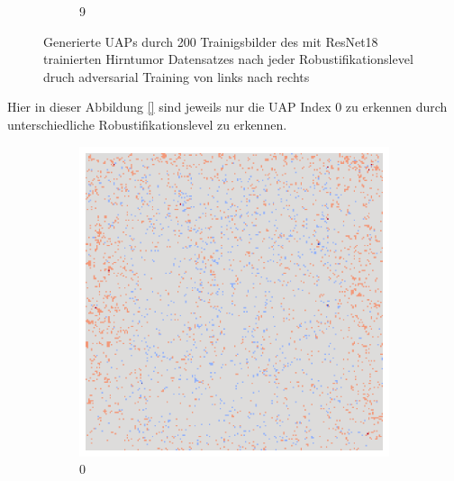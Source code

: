 \begin{figure}[ht!]
\begin{subfigure}{0.095\linewidth}
        \caption{9}
    \end{subfigure}
    \caption{Generierte UAPs durch 200 Trainigsbilder des mit ResNet18 trainierten Hirntumor Datensatzes nach jeder Robustifikationslevel druch adversarial Training von links nach rechts}
    \label{fig:uap-resnet18-covidx-rob0}
\end{figure}

Hier in dieser Abbildung \ref{} sind jeweils nur die UAP Index 0 zu erkennen durch unterschiedliche Robustifikationslevel zu erkennen. 

\begin{figure}[ht!]
    \centering
    \begin{subfigure}{0.095\linewidth}
        \centering
        \includegraphics[height=1\linewidth]{01-images/05-resultate/uap_resnet/uap0-resnet18-mri-n200-robustificationslevel0.png}
        \caption{0}
    \end{subfigure}\hfill%
    \begin{subfigure}{0.095\linewidth}
        \centering

\end{subfigure}
\end{figure}
